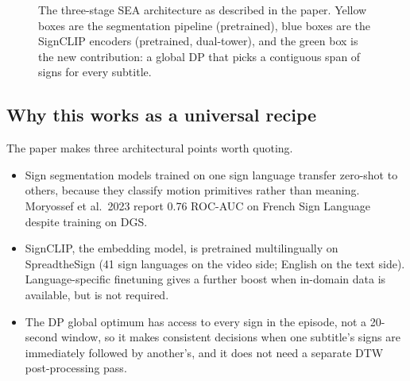 \documentclass[11pt,a4paper]{article}
\def\textbf#1{#1}%
\def\emph#1{#1}%
\begin{document}
\begin{figure}[h]
\caption{The three-stage SEA architecture as described in the paper. Yellow
boxes are the segmentation pipeline (pretrained), blue boxes are the SignCLIP
encoders (pretrained, dual-tower), and the green box is the new contribution:
a global DP that picks a contiguous span of signs for every subtitle.}
\label{fig:sea-arch}
\end{figure}

\subsection{Why this works as a universal recipe}
The paper makes three architectural points worth quoting.
\begin{itemize}[leftmargin=1.5em]
  \item Sign \emph{segmentation} models trained on one sign language transfer
        zero-shot to others, because they classify motion primitives rather
        than meaning. Moryossef et al.\ 2023 report 0.76 ROC-AUC on French
        Sign Language despite training on DGS.
  \item SignCLIP, the embedding model, is pretrained \emph{multilingually} on
        SpreadtheSign (41 sign languages on the video side; English on the
        text side). Language-specific finetuning gives a further boost when
        in-domain data is available, but is not required.
  \item The DP \emph{global} optimum has access to every sign in the episode,
        not a 20-second window, so it makes consistent decisions when one
        subtitle's signs are immediately followed by another's, and it does
        not need a separate DTW post-processing pass.
\end{itemize}
\end{document}
